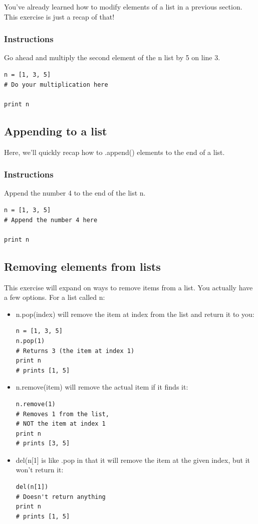 \documentclass[12pt,a4paper,final,twoside,onecolumn,titlepage]{book}
\begin{document}
You've already learned how to modify elements of a list in a previous section. This exercise is just a recap of that!
\subsubsection{Instructions}
Go ahead and multiply the second element of the n list by 5 on line 3.
\begin{lstlisting}
n = [1, 3, 5]
# Do your multiplication here

print n
\end{lstlisting}

\subsection{Appending to a list}

Here, we'll quickly recap how to .append() elements to the end of a list.
\subsubsection{Instructions}

Append the number 4 to the end of the list n.

\begin{lstlisting}
n = [1, 3, 5]
# Append the number 4 here

print n
\end{lstlisting}

\subsection{Removing elements from lists}

This exercise will expand on ways to remove items from a list. You actually have a few options. For a list called n:
\begin{itemize}
\item    n.pop(index) will remove the item at index from the list and return it to you:
\begin{lstlisting}
n = [1, 3, 5]
n.pop(1)
# Returns 3 (the item at index 1)
print n
# prints [1, 5]
\end{lstlisting}
\item    n.remove(item) will remove the actual item if it finds it:
\begin{lstlisting}
n.remove(1)
# Removes 1 from the list,
# NOT the item at index 1
print n
# prints [3, 5]
\end{lstlisting}
\item    del(n[1] is like .pop in that it will remove the item at the given index, but it won't return it:
\begin{lstlisting}
del(n[1])
# Doesn't return anything
print n
# prints [1, 5]
\end{lstlisting}
\end{itemize}
\end{document}
